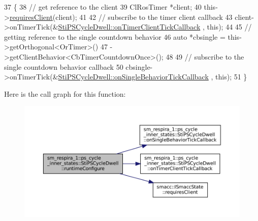 \begin{DoxyCode}
37   \{
38     \textcolor{comment}{// get reference to the client}
39     ClRosTimer *client;
40     this->\hyperlink{classsmacc_1_1ISmaccState_a7f95c9f0a6ea2d6f18d1aec0519de4ac}{requiresClient}(client);
41 
42     \textcolor{comment}{// subscribe to the timer client callback}
43     client->onTimerTick(&\hyperlink{structsm__respira__1_1_1ps__cycle__inner__states_1_1StiPSCycleDwell_a01112c5545a2fcf9bf83057eb2748f73}{StiPSCycleDwell::onTimerClientTickCallback}
      , \textcolor{keyword}{this});
44 
45     \textcolor{comment}{// getting reference to the single countdown behavior}
46     \textcolor{keyword}{auto} *cbsingle = this->getOrthogonal<OrTimer>()
47                           ->getClientBehavior<CbTimerCountdownOnce>();
48 
49     \textcolor{comment}{// subscribe to the single countdown behavior callback}
50     cbsingle->onTimerTick(&\hyperlink{structsm__respira__1_1_1ps__cycle__inner__states_1_1StiPSCycleDwell_a0e949b981066fe796ddb15fd7875056a}{StiPSCycleDwell::onSingleBehaviorTickCallback}
      , \textcolor{keyword}{this});
51   \}
\end{DoxyCode}
Here is the call graph for this function\+:
\nopagebreak
\begin{figure}[H]
\begin{center}
\leavevmode
\includegraphics[width=350pt]{structsm__respira__1_1_1ps__cycle__inner__states_1_1StiPSCycleDwell_ac3b64b8ba4020a441f1daa5b8b01fd91_cgraph}
\end{center}
\end{figure}
\mbox{\label{structsm__respira__1_1_1ps__cycle__inner__states_1_1StiPSCycleDwell_af642d65faee889b5bf5b2ad6bd48fedc}} 
